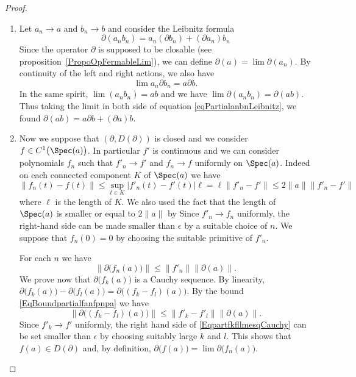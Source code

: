 \begin{proof}
\begin{enumerate}
        \item
            Let \( a_n\to a\) and \( b_n\to b\) and consider the Leibnitz formula
            \begin{equation}        \label{eqPartialanbnLeibnitz}
                \partial(a_nb_n)=a_n(\partial b_n)+(\partial a_n)b_n
            \end{equation}
            Since the operator \( \partial\) is supposed to be closable (see proposition~\ref{PropoOpFermableLim}), we can define \( \partial(a)=\lim\partial(a_n)\). By continuity of the left and right actions, we also have
            \begin{equation}
                \lim a_n\partial b_n=a\partial b.
            \end{equation}
            In the same spirit, \( \lim(a_nb_n)=ab\) and we have \( \lim\partial(a_nb_n)=\partial(ab)\). Thus taking the limit in both side of equation \eqref{eqPartialanbnLeibnitz}, we found \( \partial(ab)=a\partial b+(\partial a)b\).
        \item
            Now we suppose that \( (\partial,D(\partial))\) is closed and we consider \( f\in C^1\big( \Spec(a) \big)\). In particular \( f'\) is continuous and we can consider polynomials \( f_n\) such that \( f'_n\to f'\) and \( f_n\to f\) uniformly on \( \Spec(a)\). Indeed on each connected component \( K\) of \( \Spec(a)\) we have
            \begin{equation}
                \| f_n(t)-f(t) \|\leq \sup_{t\in K}| f'_n(t)-f'(t) |\ell=\ell\| f'_n-f' \|\leq 2\| a \|\| f'_n-f' \|
            \end{equation}
            where \( \ell\) is the length of \( K\). We also used the fact that the length of \( \Spec(a)\) is smaller or equal to \( 2\| a \|\) by  Since \( f'_n\to f_n\) uniformly, the right-hand side can be made smaller than \( \epsilon\) by a suitable choice of \( n\). We suppose that \( f_n(0)=0\) by choosing the suitable primitive of \( f'_n\).

            For each \( n\) we have
            \begin{equation}
                \| \partial\big( f_n(a) \big) \|\leq \| f'_n \|\| \partial(a) \|.
            \end{equation}
            We prove now that \( \partial\big( f_k(a) \big)\) is a Cauchy sequence. By linearity, \( \partial\big( f_k(a) \big)-\partial\big( f_l(a) \big)=\partial\big( (f_k-f_l)(a) \big)\). By the bound \eqref{EqBoundpartialfanfpnpa} we have
            \begin{equation}        \label{EqpartfkfllmesqCauchy}
                \| \partial\big( (f_k-f_l)(a) \big) \|\leq \| f'_k-f'_l \|\| \partial(a) \|.
            \end{equation}
            Since \( f'_k\to f'\) uniformly, the right hand side of \eqref{EqpartfkfllmesqCauchy} can be set smaller than \( \epsilon\) by choosing suitably large \( k\) and \( l\). This shows that \( f(a)\in D(\partial)\) and, by definition, \( \partial\big( f(a) \big)=\lim\partial\big( f_n(a) \big)\).


\end{enumerate}
\end{proof}
